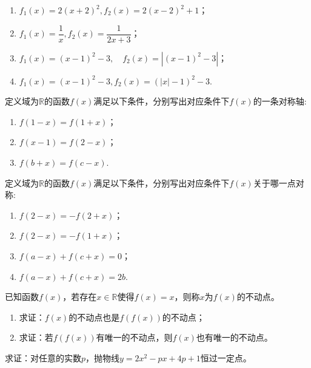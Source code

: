 \documentclass[lang=cn,math=cm,chinesefont=nofont,11pt,scheme=chinese,onecol]{elegantbook}
\begin{document}
\begin{spacing}{1.7}
  \begin{enumerate}
    \item $f_{1}(x)=2(x+2)^{2}, f_{2}(x)=2(x-2)^{2}+1$；
    \item $f_{1}(x)=\dfrac{1}{x}, f_{2}(x)=\dfrac{1}{2x+3}$；
    \item $f_{1}\left(x\right)=\left(x-1\right)^{2}-3,\quad f_{2}\left(x\right)=\left|\left(x-1\right)^{2}-3\right|$；
    \item $f_{1}(x)=(x-1)^{2}-3,f_{2}(x)=(|x|-1)^{2}-3$.
  \end{enumerate}
\end{spacing}

\begin{exercise}
  定义域为$\mathbb{R}$的函数$f(x)$满足以下条件，分别写出对应条件下$f(x)$的一条对称轴:
\end{exercise}

\begin{enumerate}
  \item $f(1-x)=f(1+x)$；
  \item $f(x-1)=f(2-x)$；
  \item $f(b+x)=f(c-x)$.
\end{enumerate}

\begin{exercise}
  定义域为$\mathbb{R}$的函数$f(x)$满足以下条件，分别写出对应条件下$f(x)$关于哪一点对称:
\end{exercise}

\begin{enumerate}
  \item $f(2-x)=-f(2+x)$；
  \item $f(2-x)=-f(1+x)$；
  \item $f(a-x)+f(c+x)=0$；
  \item $f(a-x)+f(c+x)=2b$.
\end{enumerate}

\begin{exercise}
  已知函数$f(x)$，若存在$x\in\mathbb{R}$使得$f(x)=x$，则称$x$为$f(x)$的不动点。
\end{exercise}

\begin{enumerate}
  \item 求证：$f(x)$的不动点也是$f(f(x))$的不动点；
  \item 求证：若$f(f(x))$有唯一的不动点，则$f(x)$也有唯一的不动点。
\end{enumerate}

\begin{exercise}\label{ASJC_G1_P22.5}
  求证：对任意的实数$p$，抛物线$y=2x^2-px+4p+1$恒过一定点。
\end{exercise}
\end{document}
